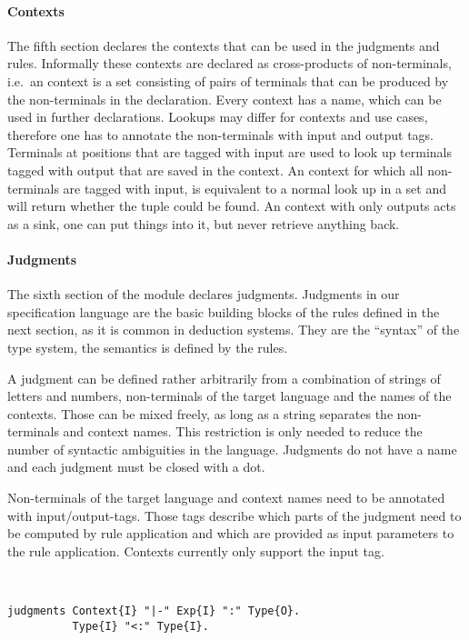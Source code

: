 \paragraph{Contexts} The fifth section declares the contexts that can
be used in the judgments and rules. Informally these contexts are
declared as cross-products of non-terminals, i.e.\ an context is a set
consisting of pairs of terminals that can be produced by the
non-terminals in the declaration. Every context has a name, which can
be used in further declarations. Lookups may differ for contexts and
use cases, therefore one has to annotate the non-terminals with input
and output tags. Terminals at positions that are tagged with input are
used to look up terminals tagged with output that are saved in the
context. An context for which all non-terminals are tagged with input,
is equivalent to a normal look up in a set and will return whether the
tuple could be found. An context with only outputs acts as a sink, one
can put things into it, but never retrieve anything back.

\paragraph{Judgments} The sixth section of the module declares
judgments. Judgments in our specification language are the basic
building blocks of the rules defined in the next section, as it is
common in deduction systems. They are the ``syntax'' of the type
system, the semantics is defined by the rules.

A judgment can be defined rather arbitrarily from a combination of
strings of letters and numbers, non-terminals of the target language
and the names of the contexts. Those can be mixed freely, as long as a
string separates the non-terminals and context names. This restriction
is only needed to reduce the number of syntactic ambiguities in the
language. Judgments do not have a name and each judgment must be
closed with a dot.

Non-terminals of the target language and context names need to be
annotated with input/output-tags. Those tags describe which parts of
the judgment need to be computed by rule application and which are
provided as input parameters to the rule application. Contexts
currently only support the input tag.

\begin{example}{~}
\begin{lstlisting}[language=sltc]
judgments Context{I} "|-" Exp{I} ":" Type{O}.
          Type{I} "<:" Type{I}.
\end{lstlisting}
\label{ex:judgment-section}
\end{example}

